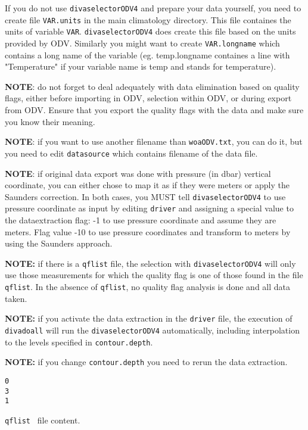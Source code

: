 \documentclass[8pt,a4paper,notitlepage]{book}
\begin{document}
If you do not use {\tt divaselectorODV4} and prepare your data yourself, you need to create  file {\tt VAR.units} in the main climatology directory. This file containes the units of variable {\tt VAR}. {\tt divaselectorODV4} does create this file based on the units provided by ODV. Similarly you might want to create {\tt VAR.longname} which contains a long name of the variable (eg. temp.longname containes a line with "Temperature" if your variable name is temp and stands for temperature).

{\bf NOTE}: do not forget to deal adequately with data elimination based on quality flags, either before importing in ODV, selection within ODV, or during export from ODV. Ensure that you export the quality flags with the data and make sure you know their meaning.

{\bf NOTE}: if you want to use another filename than {\tt woaODV.txt}, you can do it, but you need to edit {\tt datasource} which contains filename of the data file.

{\bf NOTE}: if original data export was done with pressure (in dbar) vertical coordinate, you can either chose to map it as if they were meters or apply the Saunders correction. In both cases, you MUST tell {\tt divaselectorODV4} to use pressure coordinate as input by editing {\tt driver} and assigning a special value to the dataextraction flag: -1 to use pressure coordinate and assume they are meters. Flag value -10 to use pressure coordinates and transform to meters by using the Saunders approach.


{\bf NOTE:} if there is a {\tt qflist} file, the selection with {\tt divaselectorODV4} will only use those measurements for which the quality flag is one of those found in the file {\tt qflist}. In the absence of {\tt qflist}, no quality flag analysis is done and all data taken.

{\bf NOTE:} if you activate the data extraction in the {\tt driver} file, the execution of {\tt divadoall} will run the {\tt divaselectorODV4} automatically, including interpolation to the levels specified in {\tt contour.depth}. 

{\bf NOTE:} if you change {\tt contour.depth} you need to rerun the data extraction.
 
\begin{exfile}[H]
\begin{footnotesize}
\begin{verbatim}
0
3
1
\end{verbatim}
\end{footnotesize}
\caption{{\tt qflist } file content.} 
\end{exfile}
\end{document}
